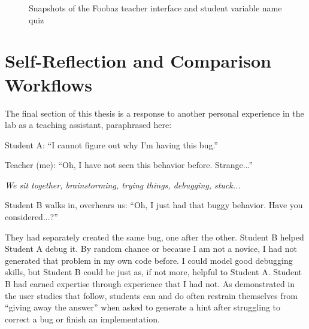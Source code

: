 \begin{figure}[p]
\caption{Snapshots of the Foobaz teacher interface and student variable name quiz}
\end{figure}


\section{Self-Reflection and Comparison Workflows}


The final section of this thesis is a response to another personal experience in the lab as a teaching assistant, paraphrased here:
\begin{displayquote}
    Student A: ``I cannot figure out why I'm having this bug.''

    Teacher (me): ``Oh, I have not seen this behavior before. Strange...''

    {\it We sit together, brainstorming, trying things, debugging, stuck...}

    Student B walks in, overhears us: ``Oh, I just had that buggy behavior. Have you considered...?''
\end{displayquote}
They had separately created the same bug, one after the other. Student B helped Student A debug it. By random chance or because I am not a novice, I had not generated that problem in my own code before. I could model good debugging skills, but Student B could be just as, if not more, helpful to Student A. Student B had earned expertise through experience that I had not. As demonstrated in the user studies that follow, students can and do often restrain themselves from ``giving away the answer'' when asked to generate a hint after struggling to correct a bug or finish an implementation. 


